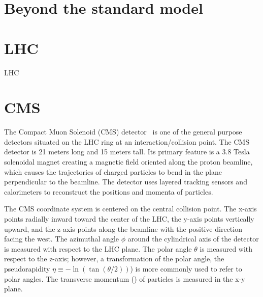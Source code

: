 \FloatBarrier

\section{Beyond the standard model}



\section{LHC}


LHC~\cite{LHC:Evans1129806}



\section{CMS}

The Compact Muon Solenoid (CMS)
detector~\cite{CMS:Chatrchyan2008zzk,CMS:PTDR2} is one of the general purpose
detectors situated on the LHC ring at an interaction/collision point. 
The CMS detector is 21 meters long and 15 meters tall. Its primary feature
is a 3.8 Tesla solenoidal magnet creating a magnetic field oriented along the proton 
beamline, which causes the trajectories of charged particles to bend in the plane
perpendicular to the beamline.
The detector uses layered tracking sensors and calorimeters to reconstruct the
positions and momenta of particles.

The CMS coordinate system is centered on the central collision point.
The x-axis points radially inward toward the center of the LHC,
the y-axis points vertically upward, and the z-axis points along the beamline
with the positive direction facing the west. The azimuthal angle $\phi$
around the cylindrical axis of the detector
is measured with respect to the LHC plane. The polar angle $\theta$
is measured with respect to the z-axis; however, a 
transformation of the polar angle, the pseudorapidity $\eta \equiv -\ln (\tan (\theta/2))$) 
is more commonly used
to refer to polar angles. The transverse momentum (\pt) of particles 
is measured in the x-y plane.

